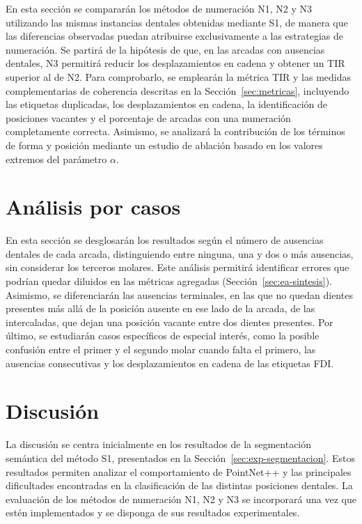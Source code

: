 En esta sección se compararán los métodos de numeración N1, N2 y N3 utilizando las mismas instancias dentales obtenidas mediante S1, de manera que las diferencias observadas puedan atribuirse exclusivamente a las estrategias de numeración. Se partirá de la hipótesis de que, en las arcadas con ausencias dentales, N3 permitirá reducir los desplazamientos en cadena y obtener un TIR superior al de N2. Para comprobarlo, se emplearán la métrica TIR y las medidas complementarias de coherencia descritas en la Sección~\ref{sec:metricas}, incluyendo las etiquetas duplicadas, los desplazamientos en cadena, la identificación de posiciones vacantes y el porcentaje de arcadas con una numeración completamente correcta. Asimismo, se analizará la contribución de los términos de forma y posición mediante un estudio de ablación basado en los valores extremos del parámetro $\alpha$.

\section{Análisis por casos}
\label{sec:exp-casos}

En esta sección se desglosarán los resultados según el número de ausencias dentales de cada arcada, distinguiendo entre ninguna, una y dos o más ausencias, sin considerar los terceros molares. Este análisis permitirá identificar errores que podrían quedar diluidos en las métricas agregadas (Sección~\ref{sec:ea-sintesis}). Asimismo, se diferenciarán las ausencias terminales, en las que no quedan dientes presentes más allá de la posición ausente en ese lado de la arcada, de las intercaladas, que dejan una posición vacante entre dos dientes presentes. Por último, se estudiarán casos específicos de especial interés, como la posible confusión entre el primer y el segundo molar cuando falta el primero, las ausencias consecutivas y los desplazamientos en cadena de las etiquetas FDI.

\section{Discusión}
\label{sec:exp-discusion}

La discusión se centra inicialmente en los resultados de la segmentación semántica del método S1, presentados en la Sección~\ref{sec:exp-segmentacion}. Estos resultados permiten analizar el comportamiento de PointNet++ y las principales dificultades encontradas en la clasificación de las distintas posiciones dentales. La evaluación de los métodos de numeración N1, N2 y N3 se incorporará una vez que estén implementados y se disponga de sus resultados experimentales.


